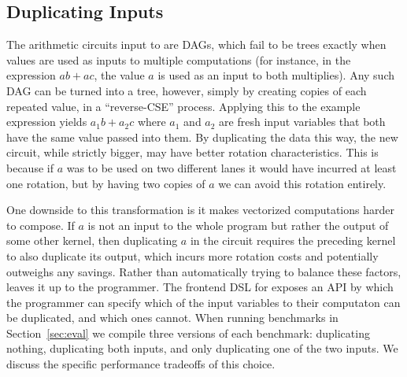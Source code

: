 \subsection{Duplicating Inputs}\label{sec:duplicating-inputs}
The arithmetic circuits input to \system are DAGs, which fail to be trees exactly when values are used as inputs to multiple computations (for instance, in the expression $ab + ac$, the value $a$ is used as an input to both multiplies).
Any such DAG can be turned into a tree, however, simply by creating copies of each repeated value, in a ``reverse-CSE'' process.
Applying this to the example expression yields $a_1b + a_2c$ where $a_1$ and $a_2$ are fresh input variables that both have the same value passed into them.
By duplicating the data this way, the new circuit, while strictly bigger, may have better rotation characteristics.
This is because if $a$ was to be used on two different lanes it would have incurred at least one rotation, but by having two copies of $a$ we can avoid this rotation entirely.

One downside to this transformation is it makes vectorized computations harder to compose.
If $a$ is not an input to the whole program but rather the output of some other kernel, then duplicating $a$ in the circuit requires the preceding kernel to also duplicate its output, which incurs more rotation costs and potentially outweighs any savings.
Rather than automatically trying to balance these factors, \system leaves it up to the programmer.
The frontend DSL for \system exposes an API by which the programmer can specify which of the input variables to their computaton can be duplicated, and which ones cannot.
When running benchmarks in Section~\ref{sec:eval} we compile three versions of each benchmark: duplicating nothing, duplicating both inputs, and only duplicating one of the two inputs.
We discuss the specific performance tradeoffs of this choice.  


